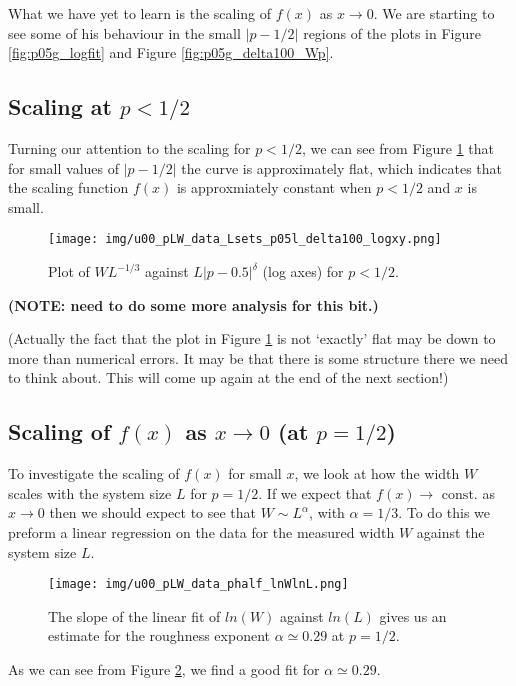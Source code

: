 \documentclass[a4paper,10pt]{article}
\newcommand{\fref}[1]{Figure \ref{#1}}
\begin{document}
What we have yet to learn is the scaling of $f(x)$ as $x \to 0$. We are starting to see some of his behaviour in the small $|p-1/2|$ regions of the plots in \fref{fig:p05g_logfit} and \fref{fig:p05g_delta100_Wp}.

\subsection{Scaling at $p < 1/2$}

Turning our attention to the scaling for $p < 1/2$, we can see from \fref{fig:p05l_delta1} that for small values of $|p-1/2|$ the curve is approximately flat, which indicates that the scaling function $f(x)$ is approxmiately constant when $p < 1/2$ and $x$ is small.
\begin{figure}
  \centering
  \texttt{[image: img/u00\_pLW\_data\_Lsets\_p05l\_delta100\_logxy.png]}
  \caption{Plot of $WL^{-1/3}$ against $L|p-0.5|^\delta$ (log axes) for $p < 1/2$.}
  \label{fig:p05l_delta1}
\end{figure}

{\bf (NOTE: need to do some more analysis for this bit.)}

(Actually the fact that the plot in \fref{fig:p05l_delta1} is not `exactly' flat may be down to more than numerical errors. It may be that there is some structure there we need to think about. This will come up again at the end of the next section!)

\subsection{Scaling of $f(x)$ as $x\to0$ (at $p = 1/2$)}

To investigate the scaling of $f(x)$ for small $x$, we look at how the width $W$ scales with the system size $L$ for $p = 1/2$. If we expect that $f(x)\to\mbox{ const.}$ as $x \to 0$ then we should expect to see that $W \sim L^\alpha$, with $\alpha = 1/3$. To do this we preform a linear regression on the data for the measured width $W$ against the system size $L$.
\begin{figure}
  \centering
  \texttt{[image: img/u00\_pLW\_data\_phalf\_lnWlnL.png]}
  \caption{The slope of the linear fit of $ln(W)$ against $ln(L)$ gives us an estimate for the roughness exponent $\alpha\simeq0.29$ at $p=1/2$.}
  \label{fig:phalf_fit}
\end{figure}
As we can see from \fref{fig:phalf_fit}, we find a good fit for $\alpha\simeq0.29$. 
\end{document}
